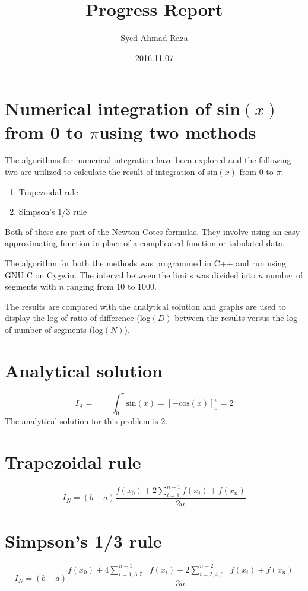 \documentclass[12pt,a4paper,fleqn]{article}
\title{Progress Report}
\author{Syed Ahmad Raza}
\date{2016.11.07}
\begin{document}
	\maketitle
	
	\section*{Numerical integration of sin$(x)$ from 0 to $\pi$\linebreak using two methods}
	The algorithms for numerical integration have been explored and the following two are utilized to calculate the result of integration of sin$(x)$ from $0$ to $\pi$:
	\begin{enumerate}
		\item Trapezoidal rule
		\item Simpson's 1/3 rule
	\end{enumerate}

	Both of these are part of the Newton-Cotes formulas. They involve using an easy approximating function in place of a complicated function or tabulated data.

	The algorithm for both the methods was programmed in C++ and run using GNU C on Cygwin. The interval between the limits was divided into $n$ number of segments with $n$ ranging from $10$ to $1000$.
	
	The results are compared with the analytical solution and graphs are used to display the log of ratio of difference (log$(D)$ between the results versus the log of number of segments (log$(N)$).
	
	\section*{Analytical solution}
	\begin{equation}
	I_A = \qquad\int_{0}^{\pi}\text{sin}(x) = [-\text{cos}(x)]_0^\pi = 2
	\end{equation}
	The analytical solution for this problem is $2$.
	
	\section*{Trapezoidal rule}
	\begin{equation}
	I_N = (b-a)\frac{f(x_0)+2\sum\limits_{i=1}^{n-1}f(x_i)+f(x_n)}{2n}
	\end{equation}
	
	\section*{Simpson's 1/3 rule}
	\begin{equation}
	I_N = (b-a)\frac{f(x_0)+4\sum\limits^{n-1}_{i=1,3,5...}f(x_i)+2\sum\limits_{i=2,4,6...}^{n-2}f(x_i)+f(x_n)}{3n}
	\end{equation}
	
\end{document}
